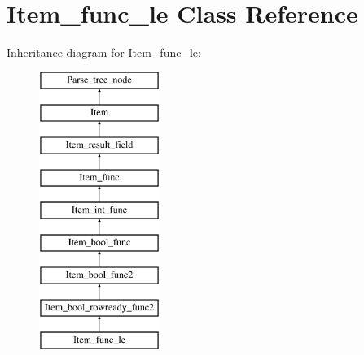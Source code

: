 \hypertarget{classItem__func__le}{}\section{Item\+\_\+func\+\_\+le Class Reference}
\label{classItem__func__le}
Inheritance diagram for Item\+\_\+func\+\_\+le\+:\begin{figure}[H]
\begin{center}
\leavevmode
\includegraphics[height=9.000000cm]{classItem__func__le}
\end{center}
\end{figure}
